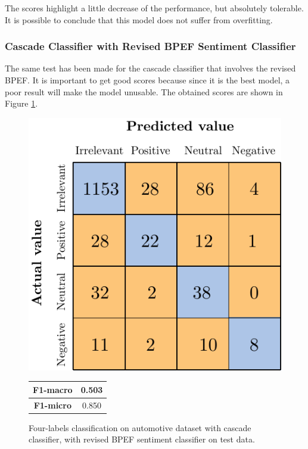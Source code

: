 The scores highlight a little decrease of the performance, but absolutely tolerable. It is possible to conclude that this model does not suffer from overfitting.


\subsubsection{Cascade Classifier with Revised BPEF Sentiment Classifier}

The same test has been made for the cascade classifier that involves the revised BPEF. It is important to get good scores because since it is the best model, a poor result will make the model unusable. The obtained scores are shown in Figure \ref{fig:ita_cascade_bpef_tst}.

\begin{figure}[H]
	\begin{minipage}[b]{0.6\linewidth}
		\centering
		\includegraphics[scale=1]{figures/conf_matrices/ita_cascade_bpef/ita_cascade_bpef_tst.pdf}
	\end{minipage}
	\begin{minipage}[b]{0.3\linewidth}
		\begin{tabular}[b]{ | c | c | } 
			\hline
			\textbf{F1-macro} & 0.503 \\
			\hline
			\textbf{F1-micro} & 0.850 \\ 
			\hline
		\end{tabular}
	\end{minipage}
	\caption{Four-labels classification on automotive dataset with cascade classifier, with revised BPEF sentiment classifier on test data.}
	\label{fig:ita_cascade_bpef_tst}
\end{figure}



